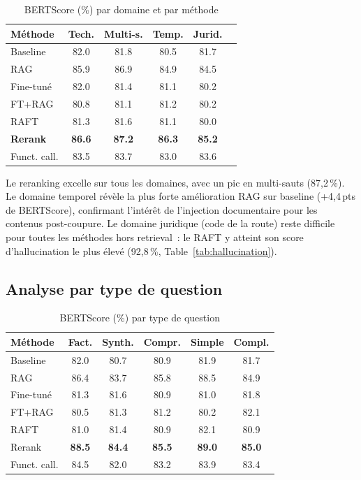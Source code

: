 \documentclass[10pt,journal,compsoc]{IEEEtran}
\newcommand{\best}[1]{\textbf{\textcolor{best}{#1}}}   %
\begin{document}
\begin{table}[h]
  \centering
  \caption{BERTScore (\%) par domaine et par méthode}
  \label{tab:domaines}
  \renewcommand{\arraystretch}{1.2}
  \begin{tabular}{lccccc}
    \toprule
    \textbf{Méthode} & \textbf{Tech.} & \textbf{Multi-s.}
      & \textbf{Temp.} & \textbf{Jurid.} \\
    \midrule
    Baseline        & 82.0 & 81.8 & 80.5 & 81.7 \\
    RAG             & 85.9 & 86.9 & 84.9 & 84.5 \\
    Fine-tuné       & 82.0 & 81.4 & 81.1 & 80.2 \\
    FT+RAG          & 80.8 & 81.1 & 81.2 & 80.2 \\
    RAFT            & 81.3 & 81.6 & 81.1 & 80.0 \\
    \textbf{Rerank} & \best{86.6} & \best{87.2}
                    & \best{86.3} & \best{85.2} \\
    Funct. call.    & 83.5 & 83.7 & 83.0 & 83.6 \\
    \bottomrule
  \end{tabular}
\end{table}

Le reranking excelle sur tous les domaines, avec un pic en
multi-sauts (87,2\,\%). Le domaine temporel révèle la plus forte
amélioration RAG sur baseline (+4,4\,pts de BERTScore), confirmant
l'intérêt de l'injection documentaire pour les contenus post-coupure.
Le domaine juridique (code de la route) reste difficile pour toutes
les méthodes hors retrieval~: le RAFT y atteint son score d'hallucination
le plus élevé (92,8\,\%, Table~\ref{tab:hallucination}).

\subsection{Analyse par type de question}

\begin{table}[h]
  \centering
  \caption{BERTScore (\%) par type de question}
  \label{tab:qtypes}
  \renewcommand{\arraystretch}{1.2}
  \begin{tabular}{lccccc}
    \toprule
    \textbf{Méthode} & \textbf{Fact.} & \textbf{Synth.}
      & \textbf{Compr.} & \textbf{Simple} & \textbf{Compl.} \\
    \midrule
    Baseline    & 82.0 & 80.7 & 80.9 & 81.9 & 81.7 \\
    RAG         & 86.4 & 83.7 & 85.8 & 88.5 & 84.9 \\
    Fine-tuné   & 81.3 & 81.6 & 80.9 & 81.0 & 81.8 \\
    FT+RAG      & 80.5 & 81.3 & 81.2 & 80.2 & 82.1 \\
    RAFT        & 81.0 & 81.4 & 80.9 & 82.1 & 80.9 \\
    Rerank      & \best{88.5} & \best{84.4} & \best{85.5}
                & \best{89.0} & \best{85.0} \\
    Funct. call.& 84.5 & 82.0 & 83.2 & 83.9 & 83.4 \\
    \bottomrule
  \end{tabular}
\end{table}
\end{document}
